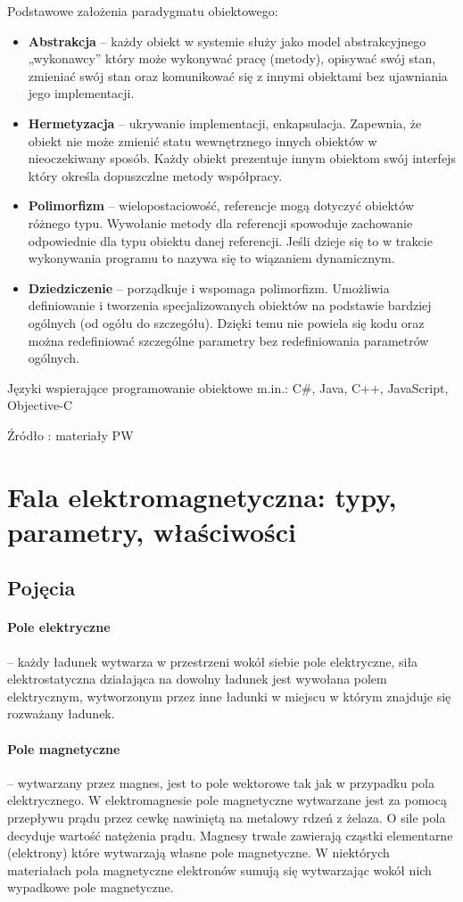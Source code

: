 \documentclass[a4paper,twoside]{report}
\begin{document}
Podstawowe założenia paradygmatu obiektowego:
\begin{itemize}
\item \textbf{Abstrakcja} – każdy obiekt w systemie służy jako model abstrakcyjnego „wykonawcy” który może wykonywać pracę (metody), opisywać swój stan, zmieniać swój stan oraz komunikować się z innymi obiektami bez ujawniania jego implementacji.
\item \textbf{Hermetyzacja} – ukrywanie implementacji, enkapsulacja. Zapewnia, że obiekt nie może zmienić statu wewnętrznego innych obiektów w nieoczekiwany sposób. Każdy obiekt prezentuje innym obiektom swój interfejs który określa dopuszczlne metody współpracy.
\item \textbf{Polimorfizm} – wielopostaciowość, referencje mogą dotyczyć obiektów różnego typu. Wywołanie metody dla referencji spowoduje zachowanie odpowiednie dla typu obiektu danej referencji. Jeśli dzieje się to w trakcie wykonywania programu to nazywa się to wiązaniem dynamicznym.
\item \textbf{Dziedziczenie} – porządkuje i wspomaga polimorfizm. Umożliwia definiowanie i tworzenia specjalizowanych obiektów na podstawie bardziej ogólnych (od ogółu do szczegółu). Dzięki temu nie powiela się kodu oraz można redefiniować szczególne parametry bez redefiniowania parametrów ogólnych.
\end{itemize}
\medskip 

Języki wspierające programowanie obiektowe m.in.: C\#, Java, C++, JavaScript, Objective-C
\medskip 

Źródło : materiały PW



\section{Fala elektromagnetyczna: typy, parametry, właściwości}
\subsection{Pojęcia}
\paragraph{Pole elektryczne} – każdy ładunek wytwarza w przestrzeni wokół siebie pole elektryczne, siła elektrostatyczna działająca na dowolny ładunek jest wywołana polem elektrycznym, wytworzonym przez inne ładunki w miejscu w którym znajduje się rozważany ładunek.

\paragraph{Pole magnetyczne} – wytwarzany przez magnes, jest to pole wektorowe tak jak w przypadku pola elektrycznego. W elektromagnesie pole magnetyczne wytwarzane jest za pomocą przepływu prądu przez cewkę nawiniętą na metalowy rdzeń z żelaza. O sile pola decyduje wartość natężenia prądu. Magnesy trwałe zawierają cząstki elementarne (elektrony) które wytwarzają własne pole magnetyczne. W niektórych materiałach pola magnetyczne elektronów sumują się wytwarzając wokół nich wypadkowe pole magnetyczne.
\end{document}
